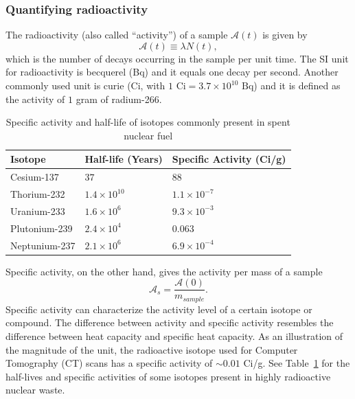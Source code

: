\documentclass[nofootinbib,preprint,aps]{revtex4-1}
\begin{document}
        \subsubsection{Quantifying radioactivity}
        The radioactivity (also called ``activity'') of a sample $\mathcal{A}(t)$ is given by
        \begin{equation}
            \label{eq:act}
            \mathcal{A}(t)\equiv \lambda N(t),
        \end{equation}
        which is the number of decays occurring in the sample per unit time. The SI
        unit for radioactivity is becquerel (Bq) and it equals one decay per second. Another commonly used
        unit is curie (Ci, with $1\text{ Ci}=3.7\times 10^{10}\text{ Bq}$) and it is defined as
        the activity of $1$ gram of radium-266.
        \begin{table}
            \centering
            \caption{Specific activity and half-life of isotopes commonly present in spent nuclear fuel \cite{toi}}
            \begin{ruledtabular}
                \begin{tabular}{l l l}
                Isotope & Half-life (Years) & Specific Activity (Ci/g)\\
                \hline
                Cesium-137 & $37$ & $88$\\
                Thorium-232 & $1.4 \times 10^{10}$ & $1.1\times 10^{-7}$\\
                Uranium-233 & $1.6\times 10^6$ & $9.3\times 10^{-3}$\\
                Plutonium-239 & $2.4\times 10^4$ & $0.063$\\
                Neptunium-237 & $2.1\times 10^6$ & $6.9\times 10^{-4}$\\
            \end{tabular}
            \label{tab:hl}
            \end{ruledtabular}
        \end{table}

        Specific activity, on the other hand, gives the activity per mass of a sample
        \begin{equation}
        \mathcal{A}_s = \frac{\mathcal{A}(0)}{{m_{sample}}}.
        \end{equation}
        Specific activity can characterize the activity level of a certain isotope or compound.
        The difference between
        activity and specific activity resembles the difference between heat capacity and specific heat
        capacity.
        As an illustration of the magnitude of the unit,
        the radioactive isotope used for Computer Tomography (CT) scans has a specific activity
        of $\sim 0.01$ Ci/g. See Table~\ref{tab:hl} for the half-lives and specific activities
        of some isotopes present in highly radioactive nuclear waste.
\end{document}
